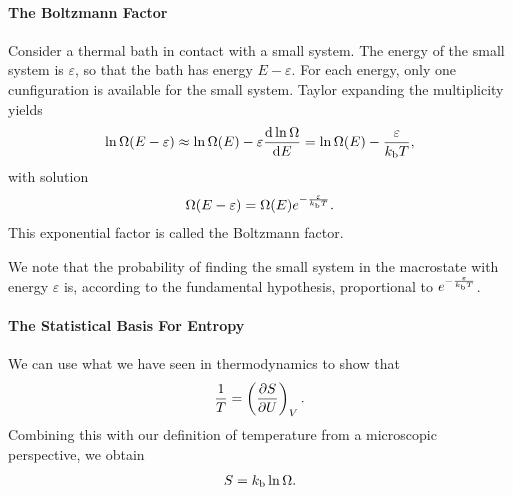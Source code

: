 \paragraph{The Boltzmann Factor}
Consider a thermal bath in contact with a small system. The energy of the small system is $\varepsilon$, so that the bath has energy $E - \varepsilon$. For each energy, only one cunfiguration is available for the small system. Taylor expanding the multiplicity yields
\begin{align*}
	\ln{\Omega(E - \varepsilon)} \approx \ln{\Omega(E)} - \varepsilon\dv{\ln{\Omega}}{E} = \ln{\Omega(E)} - \frac{\varepsilon}{k_{\text{b}} T},
\end{align*}
with solution
\begin{align*}
	\Omega(E - \varepsilon) = \Omega(E)e^{-\frac{\varepsilon}{k_{\text{b}} T}}.
\end{align*}
This exponential factor is called the Boltzmann factor.

We note that the probability of finding the small system in the macrostate with energy $\varepsilon$ is, according to the fundamental hypothesis, proportional to $e^{-\frac{\varepsilon}{k_{\text{b}} T}}$.

\paragraph{The Statistical Basis For Entropy}
We can use what we have seen in thermodynamics to show that
\begin{align*}
	\frac{1}{T} = \left(\pdv{S}{U}\right)_{V}.
\end{align*}
Combining this with our definition of temperature from a microscopic perspective, we obtain
\begin{align*}
	S = k_{\text{b}}\ln{\Omega}.
\end{align*}

